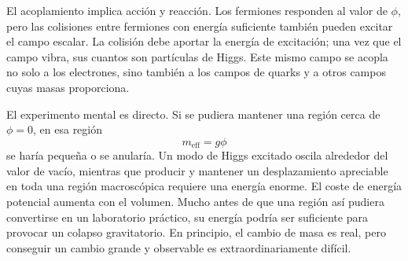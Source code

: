 El acoplamiento implica acción y reacción. Los fermiones responden al valor de \(\phi\), pero las colisiones entre fermiones con energía suficiente también pueden excitar el campo escalar. La colisión debe aportar la energía de excitación; una vez que el campo vibra, sus cuantos son partículas de Higgs. Este mismo campo se acopla no solo a los electrones, sino también a los campos de quarks y a otros campos cuyas masas proporciona.

\begin{classroomqa}
\end{classroomqa}

El experimento mental es directo. Si se pudiera mantener una región cerca de \(\phi=0\), en esa región
\begin{equation}
m_{\mathrm{eff}}=g\phi
\end{equation}
se haría pequeña o se anularía. Un modo de Higgs excitado oscila alrededor del valor de vacío, mientras que producir y mantener un desplazamiento apreciable en toda una región macroscópica requiere una energía enorme. El coste de energía potencial aumenta con el volumen. Mucho antes de que una región así pudiera convertirse en un laboratorio práctico, su energía podría ser suficiente para provocar un colapso gravitatorio. En principio, el cambio de masa es real, pero conseguir un cambio grande y observable es extraordinariamente difícil.

\begin{classroomqa}
\end{classroomqa}

\begin{classroomqa}
\end{classroomqa}

